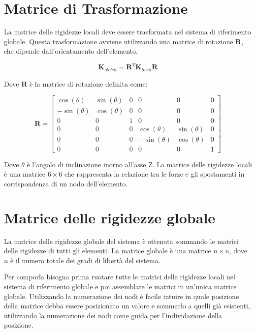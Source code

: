 \documentclass[10pt,a4paper]{article}
\begin{document}
\section{Matrice di Trasformazione}
La matrice delle rigidezze locali deve essere trasformata nel sistema di riferimento globale. Questa trasformazione avviene utilizzando una matrice di rotazione $\mathbf{R}$, che dipende dall'orientamento dell'elemento.

\begin{equation}
\mathbf{K}_{global} = \mathbf{R}^T \mathbf{K}_{local} \mathbf{R}
\label{eq:global_stiffness_formula}
\end{equation}

Dove $\mathbf{R}$ è la matrice di rotazione definita come:

\begin{equation}
\mathbf{R} = 
\begin{bmatrix}
\cos(\theta) & \sin(\theta) & 0 & 0 & 0 & 0 \\
-\sin(\theta) & \cos(\theta) & 0 & 0 & 0 & 0 \\
0 & 0 & 1 & 0 & 0 & 0 \\
0 & 0 & 0 & \cos(\theta) & \sin(\theta) & 0 \\
0 & 0 & 0 & -\sin(\theta) & \cos(\theta) & 0 \\
0 & 0 & 0 & 0 & 0 & 1
\end{bmatrix}
\end{equation}

Dove $\theta$ è l'angolo di inclinazione inorno all'asse Z.
La matrice delle rigidezze locali è una matrice $6 \times 6$ che rappresenta la relazione tra le forze e gli spostamenti in corrispondenza di un nodo dell'elemento. 

\section{Matrice delle rigidezze globale}

La matrice delle rigidezze globale del sistema è ottenuta sommando le matrici delle rigidezze di tutti gli elementi. La matrice globale è una matrice $n \times n$, dove $n$ è il numero totale dei gradi di libertà del sistema.

Per comporla bisogna prima ruotare tutte le matrici delle rigidezze locali nel sistema di riferimento globale e poi assemblare le matrici in un'unica matrice globale. Utilizzando  la numerazione dei nodi è facile intuire  in quale posizione della matrice debba essere posizionato un valore e sommarlo a quelli già esistenti,  utilizzando la numerazione dei nodi come guida per l'individazione della posizione.
\end{document}
